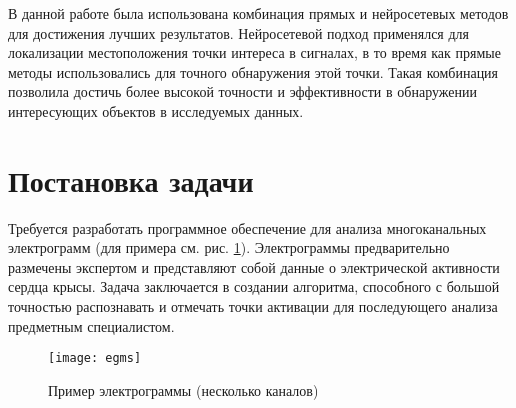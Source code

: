 В данной работе была использована комбинация прямых и нейросетевых методов для
достижения лучших результатов. Нейросетевой подход применялся для локализации
местоположения точки интереса в сигналах, в то время как прямые методы
использовались для точного обнаружения этой точки. Такая комбинация позволила
достичь более высокой точности и эффективности в обнаружении интересующих
объектов в исследуемых данных.

\section{Постановка задачи}

Требуется разработать программное обеспечение для анализа многоканальных
электрограмм (для примера см. рис. \ref{fig:egms}). Электрограммы
предварительно размечены экспертом и представляют собой данные о электрической
активности сердца крысы. Задача заключается в создании алгоритма, способного с
большой точностью распознавать и отмечать точки активации для последующего
анализа предметным специалистом.

\begin{figure}[!htb]
	\centering
	\texttt{[image: egms]}
	\caption{Пример электрограммы (несколько каналов)}
	\label{fig:egms}
\end{figure}
